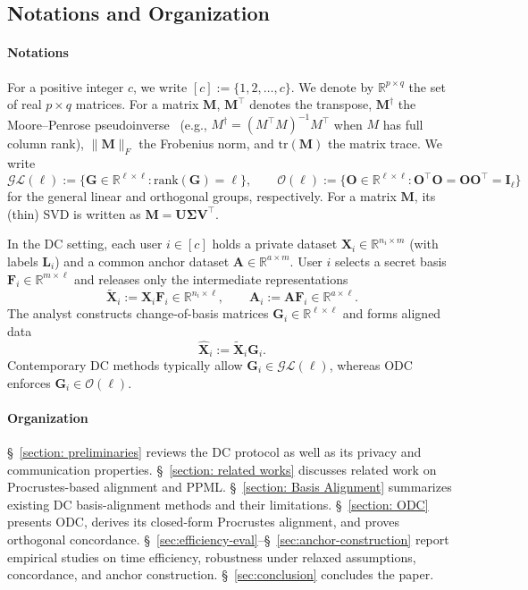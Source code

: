 \documentclass[final,3p,times]{elsarticle}
\theoremstyle{plain}
\newcommand{\matr}[1]{\bm{#1}}        %
\begin{document}
\subsection{Notations and Organization}\label{sec:notation-organization}

\paragraph{Notations}
For a positive integer $c$, we write $[c] := \{1,2,\dots,c\}$.
We denote by $\mathbb{R}^{p\times q}$ the set of real $p\times q$ matrices.
For a matrix $\matr{M}$, $\matr{M}^\top$ denotes the transpose, $\matr{M}^\dagger$ the Moore--Penrose
pseudoinverse~\cite{pseudoinverse} (e.g., $M^\dagger = (M^\top M)^{-1}M^\top$ when $M$ has full column rank), $\|\matr{M}\|_F$ the Frobenius norm, and $\mathrm{tr}(\matr{M})$ the matrix trace.
We write
\begin{equation}
\mathcal{GL}(\ell):=\{\matr{G}\in\mathbb{R}^{\ell\times\ell}:\mathrm{rank}(\matr{G})=\ell\},
\qquad
\mathcal{O}(\ell):=\{\matr{O}\in\mathbb{R}^{\ell\times\ell}:\matr{O}^\top \matr{O}=\matr{O}\matr{O}^\top=\matr{I}_\ell\}
\end{equation}
for the general linear and orthogonal groups, respectively.
For a matrix $\matr{M}$, its (thin) SVD is written as $\matr{M}=\matr{U}\matr{\Sigma}\matr{V}^\top$.

In the DC setting, each user $i\in[c]$ holds a private dataset $\matr{X}_i\in\mathbb{R}^{n_i\times m}$ (with labels $\matr{L}_i$)
and a common anchor dataset $\matr{A}\in\mathbb{R}^{a\times m}$.
User $i$ selects a secret basis $\matr{F}_i\in\mathbb{R}^{m\times \ell}$ and releases only the intermediate representations
\begin{equation}
\tilde{\matr{X}}_i := \matr{X}_i \matr{F}_i\in\mathbb{R}^{n_i\times \ell},
\qquad
\matr{A}_i := \matr{A}\matr{F}_i\in\mathbb{R}^{a\times \ell}.
\end{equation}
The analyst constructs change-of-basis matrices $\matr{G}_i\in\mathbb{R}^{\ell\times\ell}$ and forms aligned data
\begin{equation}
\hat{\matr{X}}_i := \tilde{\matr{X}}_i \matr{G}_i.
\end{equation}
Contemporary DC methods typically allow $\matr{G}_i\in\mathcal{GL}(\ell)$, whereas ODC enforces $\matr{G}_i\in\mathcal{O}(\ell)$.

\paragraph{Organization}
\S~\ref{section: preliminaries} reviews the DC protocol as well as its privacy and communication properties.
\S~\ref{section: related works} discusses related work on Procrustes-based alignment and PPML.
\S~\ref{section: Basis Alignment} summarizes existing DC basis-alignment methods and their limitations.
\S~\ref{section: ODC} presents ODC, derives its closed-form Procrustes alignment, and proves orthogonal concordance.
\S~\ref{sec:efficiency-eval}--\S~\ref{sec:anchor-construction} report empirical studies on time efficiency, robustness under relaxed assumptions, concordance,
and anchor construction. \S~\ref{sec:conclusion} concludes the paper.
\end{document}
